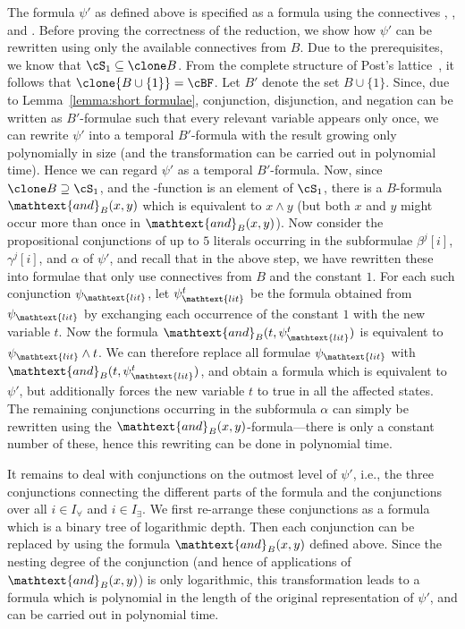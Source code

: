         The formula $\psi'$ as defined above is specified as a formula using the connectives \AND, \OR, and \NOT. Before proving the correctness of the reduction, we show how $\psi'$ can be rewritten using only the available connectives from $B$. Due to the prerequisites, we know that $\cS_1\subseteq\clone B$. From the complete structure of Post's lattice~\cite{bcrv03}, it follows that $\clone{B\cup\{1\}}=\cBF$. Let $B'$ denote the set $B\cup\{1\}$. Since, due to Lemma~\ref{lemma:short formulae}, conjunction, disjunction, and negation can be written as $B'$-formulae such that every relevant variable appears only once, we can rewrite $\psi'$ into a temporal $B'$-formula with the result growing only polynomially in size (and the transformation can be carried out in polynomial time). Hence we can regard $\psi'$ as a temporal $B'$-formula. Now, since $\clone B\supseteq\cS_1$, and the \AND-function is an element of $\cS_1$, there is a $B$-formula $\mathtext{and}_B(x,y)$ which is equivalent to $x\wedge y$ (but both $x$ and $y$ might occur more than once in $\mathtext{and}_B(x,y)$). Now consider the propositional conjunctions of up to $5$ literals occurring in the subformulae $\beta^j[i]$, $\gamma^j[i]$, and $\alpha$ of $\psi'$, and recall that in the above step, we have rewritten these into formulae that only use connectives from $B$ and the constant $1$. For each such conjunction $\psi_{\mathtext{lit}}$, let $\psi^t_{\mathtext{lit}}$ be the formula obtained from $\psi_{\mathtext{lit}}$ by exchanging each occurrence of the constant $1$ with the new variable $t$. Now the formula $\mathtext{and}_B(t,\psi^t_{\mathtext{lit}})$ is equivalent to $\psi_{\mathtext{lit}}\wedge t$. We can therefore replace all formulae $\psi_{\mathtext{lit}}$ with $\mathtext{and}_B(t,\psi^t_{\mathtext{lit}})$, and obtain a formula which is equivalent to $\psi'$, but additionally forces the new variable $t$ to true in all the affected states. The remaining conjunctions occurring in the subformula $\alpha$ can simply be rewritten using the $\mathtext{and}_B(x,y)$-formula---there is only a constant number of these, hence this rewriting can be done in polynomial time.

        It remains to deal with conjunctions on the outmost level of $\psi'$, i.e., the three conjunctions connecting the different parts of the formula and the conjunctions over all ${i\in I_\forall}$ and ${i\in I_\exists}$. We first re-arrange these conjunctions as a formula which is a binary tree of logarithmic depth. Then each conjunction can be replaced by using the formula $\mathtext{and}_B(x,y)$ defined above. Since the nesting degree of the conjunction (and hence of applications of $\mathtext{and}_B(x,y)$) is only logarithmic, this transformation leads to a formula which is polynomial in the length of the original representation of $\psi'$, and can be carried out in polynomial time.

